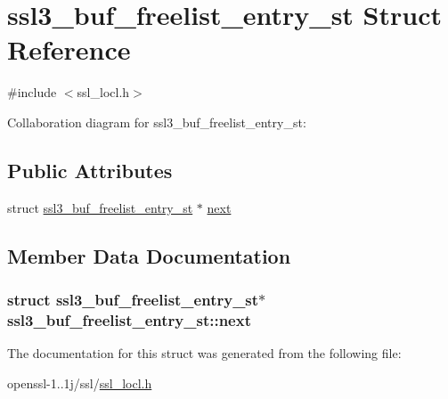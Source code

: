 \hypertarget{structssl3__buf__freelist__entry__st}{\section{ssl3\-\_\-buf\-\_\-freelist\-\_\-entry\-\_\-st Struct Reference}
\label{structssl3__buf__freelist__entry__st}
}


{\ttfamily \#include $<$ssl\-\_\-locl.\-h$>$}



Collaboration diagram for ssl3\-\_\-buf\-\_\-freelist\-\_\-entry\-\_\-st\-:
\subsection*{Public Attributes}
\begin{DoxyCompactItemize}
\item 
struct \hyperlink{structssl3__buf__freelist__entry__st}{ssl3\-\_\-buf\-\_\-freelist\-\_\-entry\-\_\-st} $\ast$ \hyperlink{structssl3__buf__freelist__entry__st_a73807a8bc3fc669204acf3801e3370f3}{next}
\end{DoxyCompactItemize}


\subsection{Member Data Documentation}
\hypertarget{structssl3__buf__freelist__entry__st_a73807a8bc3fc669204acf3801e3370f3}{
\subsubsection[{next}]{\setlength{\rightskip}{0pt plus 5cm}struct {\bf ssl3\-\_\-buf\-\_\-freelist\-\_\-entry\-\_\-st}$\ast$ ssl3\-\_\-buf\-\_\-freelist\-\_\-entry\-\_\-st\-::next}}\label{structssl3__buf__freelist__entry__st_a73807a8bc3fc669204acf3801e3370f3}


The documentation for this struct was generated from the following file\-:\begin{DoxyCompactItemize}
\item 
openssl-\/1..\-1j/ssl/\hyperlink{ssl__locl_8h}{ssl\-\_\-locl.\-h}\end{DoxyCompactItemize}
